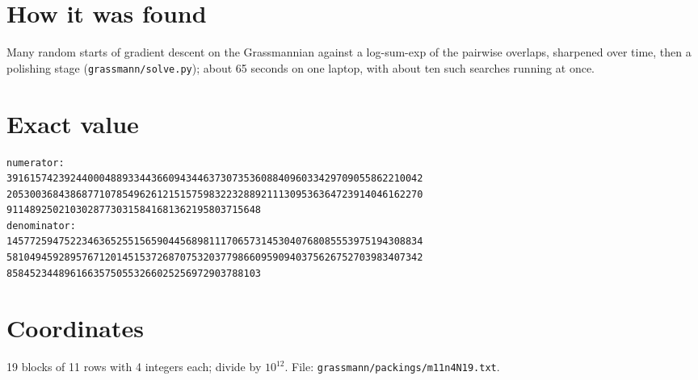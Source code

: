 \documentclass[11pt,a4paper]{article}
\begin{document}
\section{How it was found}
Many random starts of gradient descent on the Grassmannian against a log-sum-exp of the pairwise overlaps, sharpened over time, then a polishing stage (\texttt{grassmann/solve.py}); about 65 seconds on one laptop, with about ten such searches running at once.


\appendix
\section{Exact value}
{\small
\begin{verbatim}
numerator:
391615742392440004889334436609434463730735360884096033429709055862210042
205300368438687710785496261215157598322328892111309536364723914046162270
91148925021030287730315841681362195803715648
denominator:
145772594752234636525515659044568981117065731453040768085553975194308834
581049459289576712014515372687075320377986609590940375626752703983407342
85845234489616635750553266025256972903788103
\end{verbatim}}

\section{Coordinates}
19 blocks of 11 rows with 4 integers each; divide by $10^{12}$. File: \texttt{grassmann/packings/m11n4N19.txt}.
{\tiny
\begin{multicols}{3}
\end{multicols}}
\end{document}
